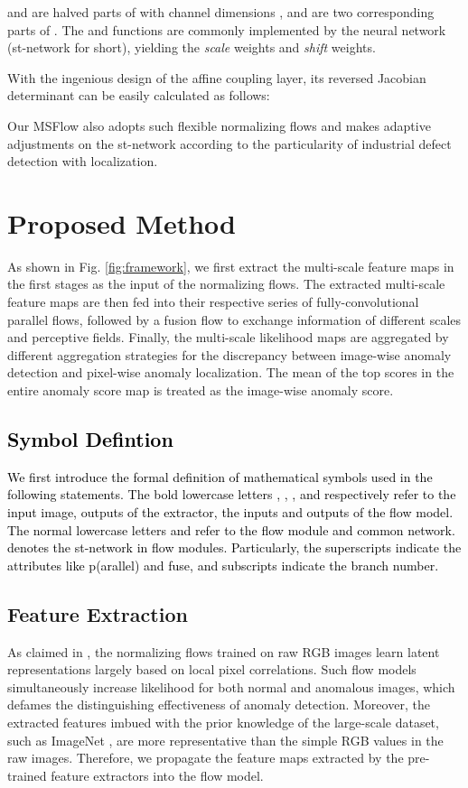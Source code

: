 \documentclass[lettersize,journal]{IEEEtran}
\newcommand{\rounda}[1]{\textcolor{black}{#1}}
\begin{document}
 and  are halved parts of  with channel dimensions ,  and  are two corresponding parts of . The  and  functions are commonly implemented by the neural network (st-network for short), yielding the \textit{scale} weights  and \textit{shift}  weights. 

With the ingenious design of the affine coupling layer, its reversed Jacobian determinant can be easily calculated as follows:

Our MSFlow also adopts such flexible normalizing flows and makes adaptive adjustments on the st-network according to the particularity of industrial defect detection with localization.

\section{Proposed Method} \label{sec:method}
As shown in Fig. \ref{fig:framework}, we first extract the multi-scale feature maps in the first  stages as the input of the normalizing flows. 
The extracted multi-scale feature maps are then fed into their respective series of fully-convolutional parallel flows, followed by a fusion flow to exchange information of different scales and perceptive fields.
Finally, the multi-scale likelihood maps are aggregated by different aggregation strategies for the discrepancy between image-wise anomaly detection and pixel-wise anomaly localization. The mean of the top scores in the entire anomaly score map is treated as the image-wise anomaly score.

\rounda{
\subsection{Symbol Defintion}
We first introduce the formal definition of mathematical symbols used in the following statements. The bold lowercase letters , , , and  respectively refer to the input image, outputs of the extractor, the inputs and outputs of the flow model.
The normal lowercase letters  and  refer to the flow module and common network.
 denotes the st-network in flow modules.
Particularly, the superscripts indicate the attributes like p(arallel) and fuse, and subscripts indicate the branch number.}

\subsection{Feature Extraction} \label{sec:feature-extraction}
As claimed in \cite{kirichenko2020normalizing}, the normalizing flows trained on raw RGB images learn latent representations largely based on local pixel correlations. Such flow models simultaneously increase likelihood for both normal and anomalous images, which defames the distinguishing effectiveness of anomaly detection. 
Moreover, the extracted features imbued with the prior knowledge of the large-scale dataset, such as ImageNet \cite{deng2009imagenet}, are more representative than the simple RGB values in the raw images.
Therefore, we propagate the feature maps extracted by the pre-trained feature extractors \cite{he2016resnet, zagoruyko2016wide} into the flow model.
\end{document}

